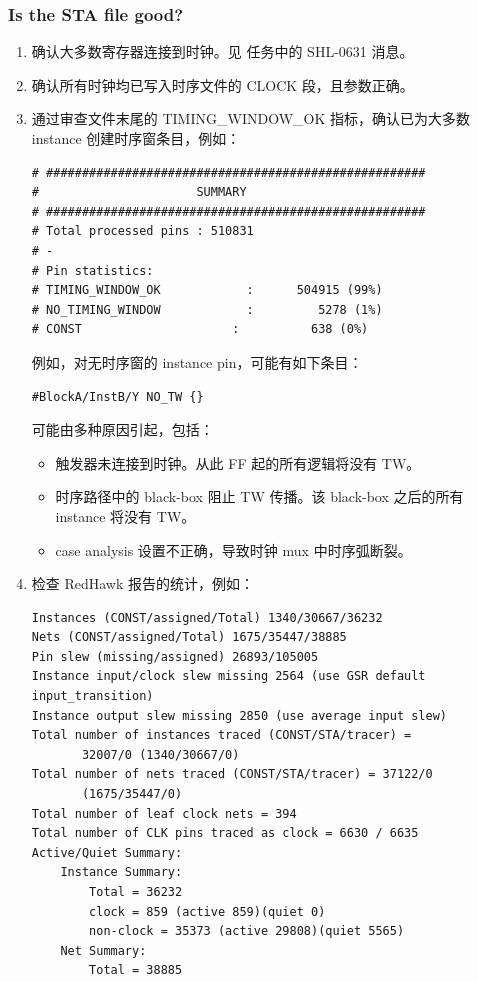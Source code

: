 \subsubsection*{Is the STA file good?}
\begin{enumerate}
  \item 确认大多数寄存器连接到时钟。见  任务中的 SHL-0631 消息。
  \item 确认所有时钟均已写入时序文件的 CLOCK 段，且参数正确。
  \item 通过审查文件末尾的 TIMING\_WINDOW\_OK 指标，确认已为大多数 instance 创建时序窗条目，例如：
\begin{lstlisting}
# #####################################################
#                      SUMMARY
# #####################################################
# Total processed pins : 510831
# -
# Pin statistics:
# TIMING_WINDOW_OK            :      504915 (99%)
# NO_TIMING_WINDOW            :         5278 (1%)
# CONST                     :          638 (0%)
\end{lstlisting}
  例如，对无时序窗的 instance pin，可能有如下条目：
\begin{lstlisting}
#BlockA/InstB/Y NO_TW {}
\end{lstlisting}
  可能由多种原因引起，包括：
  \begin{itemize}
    \item 触发器未连接到时钟。从此 FF 起的所有逻辑将没有 TW。
    \item 时序路径中的 black-box 阻止 TW 传播。该 black-box 之后的所有 instance 将没有 TW。
    \item case analysis 设置不正确，导致时钟 mux 中时序弧断裂。
  \end{itemize}
  \item 检查 RedHawk 报告的统计，例如：
\begin{lstlisting}
Instances (CONST/assigned/Total) 1340/30667/36232
Nets (CONST/assigned/Total) 1675/35447/38885
Pin slew (missing/assigned) 26893/105005
Instance input/clock slew missing 2564 (use GSR default
input_transition)
Instance output slew missing 2850 (use average input slew)
Total number of instances traced (CONST/STA/tracer) =
       32007/0 (1340/30667/0)
Total number of nets traced (CONST/STA/tracer) = 37122/0
       (1675/35447/0)
Total number of leaf clock nets = 394
Total number of CLK pins traced as clock = 6630 / 6635
Active/Quiet Summary:
    Instance Summary:
        Total = 36232
        clock = 859 (active 859)(quiet 0)
        non-clock = 35373 (active 29808)(quiet 5565)
    Net Summary:
        Total = 38885

\end{lstlisting}
\end{enumerate}
